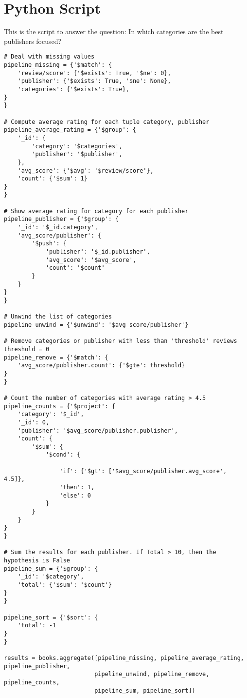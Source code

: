 
\section{Python Script}
\vspace{0.5cm}
This is the script to answer the question: In which categories are the best publishers focused?\\
\lstset{
    language=Python,
    basicstyle=\footnotesize\ttfamily,
    numbers=left,
    numberstyle=\tiny,
    numbersep=5pt
}

\begin{lstlisting}
# Deal with missing values
pipeline_missing = {'$match': {
    'review/score': {'$exists': True, '$ne': 0},
    'publisher': {'$exists': True, '$ne': None},
    'categories': {'$exists': True},
}
}

# Compute average rating for each tuple category, publisher
pipeline_average_rating = {'$group': {
    '_id': {
        'category': '$categories',
        'publisher': '$publisher',
    },
    'avg_score': {'$avg': '$review/score'},
    'count': {'$sum': 1}
}
}

# Show average rating for category for each publisher
pipeline_publisher = {'$group': {
    '_id': '$_id.category',
    'avg_score/publisher': {
        '$push': {
            'publisher': '$_id.publisher',
            'avg_score': '$avg_score',
            'count': '$count'
        }
    }
}
}

# Unwind the list of categories
pipeline_unwind = {'$unwind': '$avg_score/publisher'}

# Remove categories or publisher with less than 'threshold' reviews
threshold = 0
pipeline_remove = {'$match': {
    'avg_score/publisher.count': {'$gte': threshold}
}
}

# Count the number of categories with average rating > 4.5
pipeline_counts = {'$project': {
    'category': '$_id',
    '_id': 0,
    'publisher': '$avg_score/publisher.publisher',
    'count': {
        '$sum': {
            '$cond': {

                'if': {'$gt': ['$avg_score/publisher.avg_score', 4.5]},
                'then': 1,
                'else': 0
            }
        }
    }
}
}

# Sum the results for each publisher. If Total > 10, then the hypothesis is False
pipeline_sum = {'$group': {
    '_id': '$category',
    'total': {'$sum': '$count'}
}
}

pipeline_sort = {'$sort': {
    'total': -1
}
}

results = books.aggregate([pipeline_missing, pipeline_average_rating, pipeline_publisher,
                          pipeline_unwind, pipeline_remove, pipeline_counts,
                          pipeline_sum, pipeline_sort])
\end{lstlisting}




    